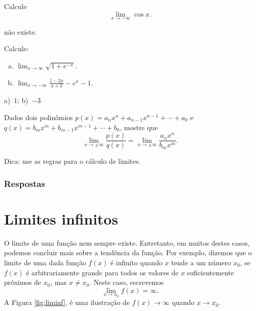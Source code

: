 \begin{exer}
  Calcule
  \begin{equation}
    \lim_{x\to -\infty} \cos x.
  \end{equation}
\end{exer}
\begin{resp}
  não existe.
\end{resp}

\begin{exer}
  Calcule:
  \begin{enumerate}[a)]
  \item $\displaystyle\lim_{x\to \infty} \sqrt{1+e^{-x}}$.
  \item $\displaystyle\lim_{x\to -\infty} \frac{1-2x}{x+3} -e^{x} - 1$.
  \end{enumerate}
\end{exer}
\begin{resp}
  a)~$1$; b)~$-3$
\end{resp}

\begin{exer}\label{exer:lim_xinf_racio}
  Dados dois polinômios $p(x) = a_nx^n+a_{n-1}x^{n-1}+\cdots + a_0$ e $q(x) = b_mx^m+b_{m-1}x^{m-1}+\cdots + b_0$, mostre que
  \begin{equation}
    \lim_{x\to \pm\infty} \frac{p(x)}{q(x)} = \lim_{x\to\pm\infty}\frac{a_nx^n}{b_mx^m}.
  \end{equation}
\end{exer}
\begin{resp}
  Dica: use as regras para o cálculo de limites.
\end{resp}

\ifisbook
\subsubsection{Respostas}
\shipoutAnswer
\fi

\section{Limites infinitos}\label{cap_lim_sec_lim_inf}

O limite de uma função nem sempre existe. Entretanto, em muitos destes casos, podemos concluir mais sobre a tendência da função. Por exemplo, dizemos que o limite de uma dada função $f(x)$ é infinito quando $x$ tende a um número $x_0$, se $f(x)$ é arbitrariamente grande para todos os valores de $x$ suficientemente próximos de $x_0$, mas $x\neq x_0$. Neste caso, escrevemos
\begin{equation}
  \lim_{x\to x_0} f(x) = \infty.
\end{equation}
A Figura \ref{fig:liminf}, é uma ilustração de $f(x)\to\infty$ quando $x\to x_0$.

